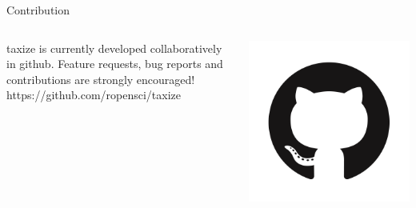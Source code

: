 \documentclass[final,t]{beamer}\usepackage[]{graphicx}\usepackage[]{color}
\begin{document}
\begin{frame}[fragile]
\begin{columns}[t]
\begin{column}{.49\linewidth}
			\begin{block}{Contribution}
				\begin{columns}[T]
					\begin{column}{.78\linewidth}
						taxize is currently developed collaboratively in github. Feature requests, bug reports and contributions are strongly encouraged! \\[0.5em]
						\huge \Mundus \normalsize \hspace{0.5cm} https://github.com/ropensci/taxize
					\end{column}
					\begin{column}{.2\linewidth}
						\includegraphics[width=0.85\linewidth]{fig/github.png}
					\end{column}
				\end{columns}
			\end{block}
		\end{column}
	\end{columns}
\end{frame}
\end{document}
